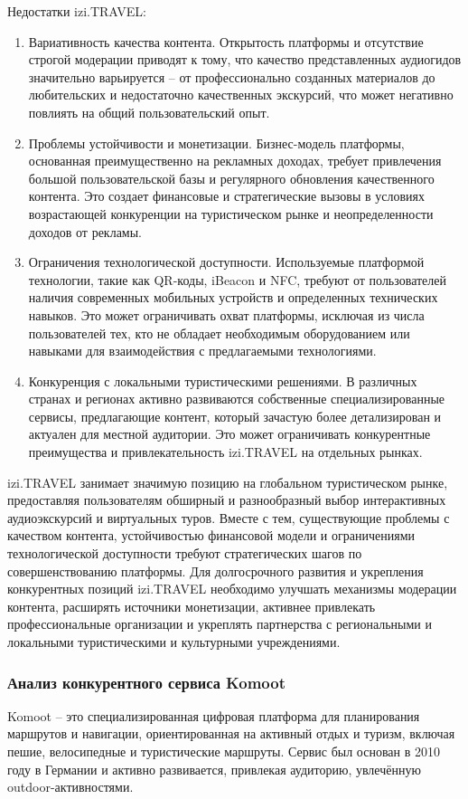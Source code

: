 \noindent Недостатки izi.TRAVEL:
\begin{enumerate}
    \item Вариативность качества контента. Открытость платформы и отсутствие строгой модерации приводят к тому, что качество представленных аудиогидов значительно варьируется – от профессионально созданных материалов до любительских и недостаточно качественных экскурсий, что может негативно повлиять на общий пользовательский опыт.
    \item Проблемы устойчивости и монетизации. Бизнес-модель платформы, основанная преимущественно на рекламных доходах, требует привлечения большой пользовательской базы и регулярного обновления качественного контента. Это создает финансовые и стратегические вызовы в условиях возрастающей конкуренции на туристическом рынке и неопределенности доходов от рекламы.
    \item Ограничения технологической доступности. Используемые платформой технологии, такие как QR-коды, iBeacon и NFC, требуют от пользователей наличия современных мобильных устройств и определенных технических навыков. Это может ограничивать охват платформы, исключая из числа пользователей тех, кто не обладает необходимым оборудованием или навыками для взаимодействия с предлагаемыми технологиями.
    \item Конкуренция с локальными туристическими решениями. В различных странах и регионах активно развиваются собственные специализированные сервисы, предлагающие контент, который зачастую более детализирован и актуален для местной аудитории. Это может ограничивать конкурентные преимущества и привлекательность izi.TRAVEL на отдельных рынках.
\end{enumerate}

\noindent izi.TRAVEL занимает значимую позицию на глобальном туристическом рынке, предоставляя пользователям обширный и разнообразный выбор интерактивных аудиоэкскурсий и виртуальных туров. Вместе с тем, существующие проблемы с качеством контента, устойчивостью финансовой модели и ограничениями технологической доступности требуют стратегических шагов по совершенствованию платформы. Для долгосрочного развития и укрепления конкурентных позиций izi.TRAVEL необходимо улучшать механизмы модерации контента, расширять источники монетизации, активнее привлекать профессиональные организации и укреплять партнерства с региональными и локальными туристическими и культурными учреждениями.

\subsubsection*{Анализ конкурентного сервиса Komoot}
Komoot – это специализированная цифровая платформа для планирования маршрутов и навигации, ориентированная на активный отдых и туризм, включая пешие, велосипедные и туристические маршруты. Сервис был основан в 2010 году в Германии и активно развивается, привлекая аудиторию, увлечённую outdoor-активностями.

